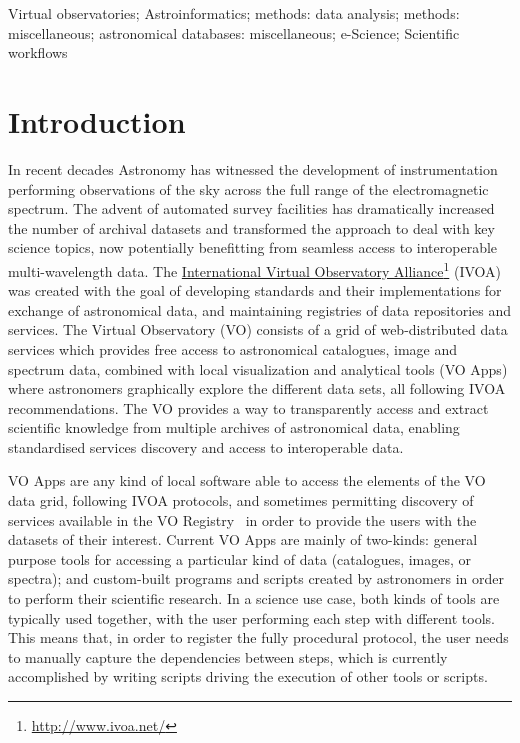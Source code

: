 \documentclass[final,authoryear,5p,times,twocolumn]{elsarticle}
\newcommand{\urlsamefont}[1]{\urlstyle{same}\url{#1}}
\newcommand{\hrefnote}[2]{\href{#1}{#2}\footnote{\urlsamefont{#1}}}
\begin{document}
\begin{frontmatter}
\begin{keyword}
Virtual observatories; Astroinformatics; methods: data analysis; methods: miscellaneous; astronomical databases: miscellaneous; e-Science; Scientific workflows
\end{keyword}

\end{frontmatter}

\section{Introduction}
\label{Introduction}

In recent decades Astronomy has witnessed the development of instrumentation performing observations of the sky across the full range of the electromagnetic spectrum. The advent of automated survey facilities has dramatically increased the number of archival datasets and transformed the approach to deal with key science topics, now potentially benefitting from seamless access to interoperable multi-wavelength data. The \hrefnote{http://www.ivoa.net/}{International Virtual  Observatory Alliance} (IVOA) was created with the goal of developing standards and their implementations for exchange of astronomical data, and maintaining registries of data repositories and services. The Virtual Observatory (VO) consists of a grid of web-distributed data services which provides free access to astronomical catalogues, image and spectrum data, combined with local visualization and analytical tools (VO Apps) where astronomers graphically explore the different data sets, all following IVOA recommendations. The VO provides a way to transparently access and extract scientific knowledge from multiple archives of astronomical data, enabling standardised services discovery and access to interoperable data. 

VO Apps are any kind of local software able to access the elements of the VO data grid, following IVOA protocols, and sometimes permitting discovery of services available in the VO Registry~\citep{Benson2009} in order to provide the users with the datasets of their interest. Current VO Apps are mainly of two-kinds: general purpose tools for accessing a particular kind of data (catalogues, images, or spectra); and custom-built programs and scripts created by astronomers in order to perform their scientific research. In a science use case, both kinds of tools are typically used together, with the user performing each step with different tools. This means that, in order to register the fully procedural protocol, the user needs to manually capture the dependencies between steps, which is currently accomplished by writing scripts driving the execution of other tools or scripts.
\end{document}
